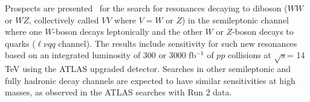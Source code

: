 \subsubsection{}

Prospects are presented~\cite{ATL-PHYS-PUB-2018-022} for the search for resonances decaying to diboson ($WW$ or $WZ$, collectively called $VV$ where $V=W$ or $Z$) 
in the semileptonic channel where one $W$-boson decays leptonically and the other $W$ or $Z$-boson decays to quarks 
($\ell\nu qq$ channel). The results include sensitivity for such new resonances based on an integrated luminosity of 300 or 3000 fb$^{-1}$  
of $pp$ collisions at $\sqrt{s}$= 14 TeV using the ATLAS upgraded detector.
Searches in other semileptonic and fully hadronic decay channels are expected to have similar sensitivities at high masses, 
as observed in the ATLAS searches with Run 2 data.

